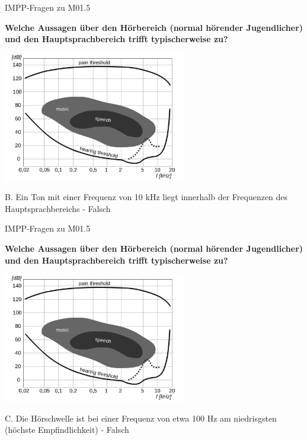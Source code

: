 \documentclass{beamer}
\begin{document}
\begin{frame}{IMPP-Fragen zu M01.5}
    
  \textbf{
Welche Aussagen über den Hörbereich (normal hörender Jugendlicher) und den Hauptsprachbereich trifft typischerweise zu?
  } \\[0.2 cm]



\begin{center}
          \includegraphics[width=0.6\textwidth]{hoerflaeche.png}
\end{center}

\begin{description}
\item{B.}  Ein Ton mit einer Frequenz von 10 kHz liegt innerhalb der Frequenzen des Hauptsprachbereichs \pause - Falsch
\end{description}  



\end{frame}



\begin{frame}{IMPP-Fragen zu M01.5}
    
  \textbf{
Welche Aussagen über den Hörbereich (normal hörender Jugendlicher) und den Hauptsprachbereich trifft typischerweise zu?
  } \\[0.2 cm]



\begin{center}
          \includegraphics[width=0.6\textwidth]{hoerflaeche.png}
\end{center}

\begin{description}
\item{C.} Die Hörschwelle ist bei einer Frequenz von etwa 100 Hz am niedrisgsten (höchste Empfindlichkeit) \pause - Falsch
\end{description}  



\end{frame}
\end{document}
